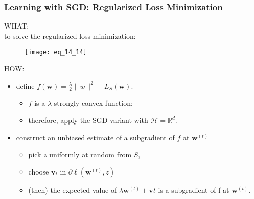\begin{frame}
\frametitle{Learning with SGD: Regularized Loss Minimization}

WHAT:\\
to solve the regularized loss minimization:
\begin{figure}
    \centering
    \texttt{[image: eq\_14\_14]}
\end{figure}

HOW:\\
\begin{itemize}
\item define $f(\mathbf{w}) = \frac{\lambda}{2} \parallel w \parallel^2 + L_S(\mathbf{w})$.
    \begin{itemize}
        \item $f$ is a $\lambda$-strongly convex function;
        \item therefore, apply the SGD variant with $\mathcal{H} = \mathbb{R}^d$.
    \end{itemize}
\item construct an unbiased estimate of a subgradient of $f$ at $\mathbf{w}^{(t)}$
    \begin{itemize}
        \item pick $z$ uniformly at random from $S$,
        \item choose $\mathbf{v}_t$ in $\partial \ell(\mathbf{w}^{(t)}, z)$
        \item (then) the expected value of $\lambda \mathbf{w}^{(t)} + \mathbf{v}t$ is a subgradient of f at $\mathbf{w}^{(t)}$.
    \end{itemize}
\end{itemize}

\end{frame}

